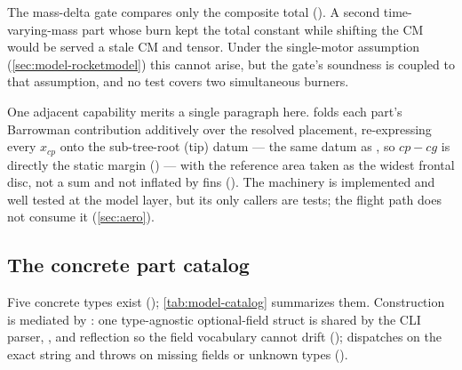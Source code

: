 \begin{keyinsight}
The mass-delta gate compares only the composite total (). A second
time-varying-mass part whose burn kept the total constant while shifting the CM would be served a
stale CM and tensor. Under the single-motor assumption (\cref{sec:model-rocketmodel}) this cannot
arise, but the gate's soundness is coupled to that assumption, and no test covers two simultaneous
burners.
\end{keyinsight}

One adjacent capability merits a single paragraph here.  folds
each part's Barrowman contribution additively over the resolved placement, re-expressing every
$x_{cp}$ onto the sub-tree-root (tip) datum --- the same datum as , so
$cp - cg$ is directly the static margin () --- with the reference
area taken as the widest frontal disc, not a sum and not inflated by fins
(). The machinery is implemented and well tested at the model layer,
but its only callers are tests; the flight path does not consume it (\cref{sec:aero}).

\subsection{The concrete part catalog}\label{sec:model-catalog}

Five concrete types exist (); \cref{tab:model-catalog} summarizes
them. Construction is mediated by : one type-agnostic optional-field struct
 is shared by the CLI parser, , and  reflection
so the field vocabulary cannot drift (); 
dispatches on the exact  string and throws on missing fields or unknown types
().

